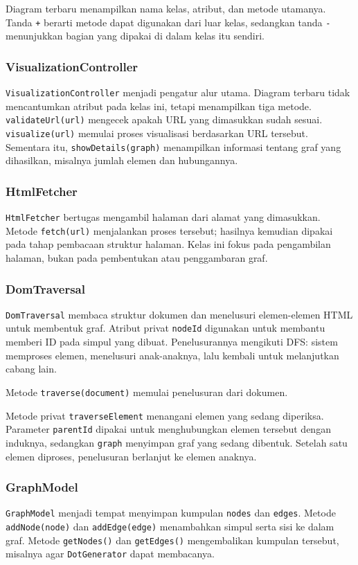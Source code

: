 Diagram terbaru menampilkan nama kelas, atribut, dan metode utamanya. Tanda \texttt{+} berarti metode dapat digunakan dari luar kelas, sedangkan tanda \texttt{-} menunjukkan bagian yang dipakai di dalam kelas itu sendiri.

\subsubsection{VisualizationController}
\texttt{VisualizationController} menjadi pengatur alur utama. Diagram terbaru tidak mencantumkan atribut pada kelas ini, tetapi menampilkan tiga metode. \texttt{validateUrl(url)} mengecek apakah URL yang dimasukkan sudah sesuai. \texttt{visualize(url)} memulai proses visualisasi berdasarkan URL tersebut. Sementara itu, \texttt{showDetails(graph)} menampilkan informasi tentang graf yang dihasilkan, misalnya jumlah elemen dan hubungannya.

\subsubsection{HtmlFetcher}
\texttt{HtmlFetcher} bertugas mengambil halaman dari alamat yang dimasukkan. Metode \texttt{fetch(url)} menjalankan proses tersebut; hasilnya kemudian dipakai pada tahap pembacaan struktur halaman. Kelas ini fokus pada pengambilan halaman, bukan pada pembentukan atau penggambaran graf.

\subsubsection{DomTraversal}
\texttt{DomTraversal} membaca struktur dokumen dan menelusuri elemen-elemen HTML untuk membentuk graf. Atribut privat \texttt{nodeId} digunakan untuk membantu memberi ID pada simpul yang dibuat. Penelusurannya mengikuti DFS: sistem memproses elemen, menelusuri anak-anaknya, lalu kembali untuk melanjutkan cabang lain.

Metode \texttt{traverse(document)} memulai penelusuran dari dokumen.

Metode privat \texttt{traverseElement} menangani elemen yang sedang diperiksa. Parameter \texttt{parentId} dipakai untuk menghubungkan elemen tersebut dengan induknya, sedangkan \texttt{graph} menyimpan graf yang sedang dibentuk. Setelah satu elemen diproses, penelusuran berlanjut ke elemen anaknya.

\subsubsection{GraphModel}
\texttt{GraphModel} menjadi tempat menyimpan kumpulan \texttt{nodes} dan \texttt{edges}. Metode \texttt{addNode(node)} dan \texttt{addEdge(edge)} menambahkan simpul serta sisi ke dalam graf. Metode \texttt{getNodes()} dan \texttt{getEdges()} mengembalikan kumpulan tersebut, misalnya agar \texttt{DotGenerator} dapat membacanya.

